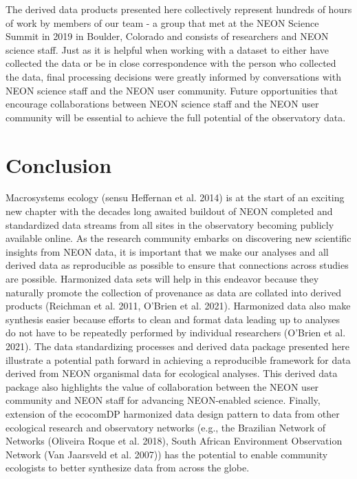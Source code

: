 \documentclass[
  12pt,
]{article}
\begin{document}
The derived data products presented here collectively represent hundreds of hours of work by members of our team - a group that met at the NEON Science Summit in 2019 in Boulder, Colorado and consists of researchers and NEON science staff. Just as it is helpful when working with a dataset to either have collected the data or be in close correspondence with the person who collected the data, final processing decisions were greatly informed by conversations with NEON science staff and the NEON user community. Future opportunities that encourage collaborations between NEON science staff and the NEON user community will be essential to achieve the full potential of the observatory data.

\hypertarget{conclusion}{%
\section{Conclusion}\label{conclusion}}

Macrosystems ecology (sensu Heffernan et al. 2014) is at the start of an exciting new chapter with the decades long awaited buildout of NEON completed and standardized data streams from all sites in the observatory becoming publicly available online. As the research community embarks on discovering new scientific insights from NEON data, it is important that we make our analyses and all derived data as reproducible as possible to ensure that connections across studies are possible. Harmonized data sets will help in this endeavor because they naturally promote the collection of provenance as data are collated into derived products (Reichman et al. 2011, O'Brien et al. 2021). Harmonized data also make synthesis easier because efforts to clean and format data leading up to analyses do not have to be repeatedly performed by individual researchers (O'Brien et al. 2021). The data standardizing processes and derived data package presented here illustrate a potential path forward in achieving a reproducible framework for data derived from NEON organismal data for ecological analyses. This derived data package also highlights the value of collaboration between the NEON user community and NEON staff for advancing NEON-enabled science. Finally, extension of the ecocomDP harmonized data design pattern to data from other ecological research and observatory networks (e.g., the Brazilian Network of Networks (Oliveira Roque et al. 2018), South African Environment Observation Network (Van Jaarsveld et al. 2007)) has the potential to enable community ecologists to better synthesize data from across the globe.
\end{document}
